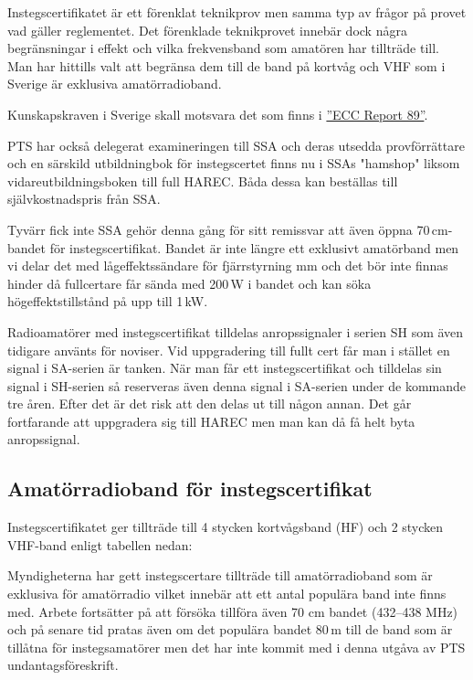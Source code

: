 Instegscertifikatet är ett förenklat teknikprov men samma typ av frågor på
provet vad gäller reglementet. Det förenklade teknikprovet innebär dock några
begränsningar i effekt och vilka frekvensband som amatören har tillträde till.
Man har hittills valt att begränsa dem till de band på kortvåg och VHF som i
Sverige är exklusiva amatörradioband.

Kunskapskraven i Sverige skall motsvara det som finns i
\href{https://docdb.cept.org/download/409}{''ECC Report 89''}.

PTS har också delegerat examineringen till SSA och deras utsedda
provförrättare och en särskild utbildningbok för instegscertet finns nu i
SSAs "hamshop" liksom vidareutbildningsboken till full HAREC. Båda dessa
kan beställas till självkostnadspris från SSA.

Tyvärr fick inte SSA gehör denna gång för sitt remissvar att även öppna
70\,cm-bandet för instegscertifikat. Bandet är inte längre ett exklusivt
amatörband men vi delar det med lågeffektssändare för fjärrstyrning mm och det
bör inte finnas hinder då fullcertare får sända med 200\,W i bandet och kan
söka högeffektstillstånd på upp till 1\,kW.

Radioamatörer med instegscertifikat tilldelas anropssignaler i serien SH som
även tidigare använts för noviser. Vid uppgradering till fullt cert får man i
stället en signal i SA-serien är tanken. När man får ett instegscertifikat och
tilldelas sin signal i SH-serien så reserveras även denna signal i SA-serien
under de kommande tre åren. Efter det är det risk att den delas ut till någon
annan. Det går fortfarande att uppgradera sig till HAREC men man kan då få
helt byta anropssignal.

\subsection{Amatörradioband för instegscertifikat}
\label{sec:instegsband}

Instegscertifikatet ger tillträde till 4 stycken kortvågsband (HF) och 2
stycken VHF-band enligt tabellen nedan:



\clearpage

Myndigheterna har gett instegscertare tillträde till amatörradioband
som är exklusiva för amatörradio vilket innebär att ett antal populära
band inte finns med. Arbete fortsätter på att försöka tillföra även 70
cm bandet (432--438 MHz) och på senare tid pratas även om det populära
bandet 80\,m till de band som är tillåtna för instegsamatörer men det
har inte kommit med i denna utgåva av PTS undantagsföreskrift.

